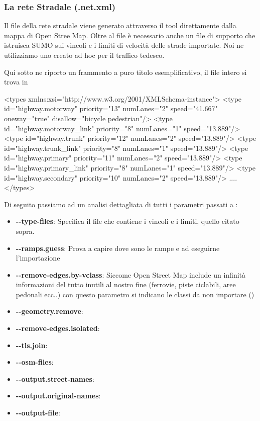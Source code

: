 \subsubsection{La rete Stradale (.net.xml)}

Il file della rete stradale viene generato attraverso il tool  direttamente dalla mappa di Open Stree Map. Oltre al file  è necessario anche un file di supporto che istruisca SUMO sui vincoli e i limiti di velocità delle strade importate. Noi ne utilizziamo uno creato ad hoc per il traffico tedesco. 

Qui sotto ne riporto un frammento a puro titolo esemplificativo, il file intero si trova in 

\begin{xml}
<types xmlns:xsi="http://www.w3.org/2001/XMLSchema-instance">
  <type id="highway.motorway" priority="13" numLanes="2" speed="41.667"
                oneway="true" disallow="bicycle pedestrian"/>
  <type id="highway.motorway_link" priority="8" numLanes="1" speed="13.889"/>
  <type id="highway.trunk" priority="12" numLanes="2" speed="13.889"/>
  <type id="highway.trunk_link" priority="8" numLanes="1" speed="13.889"/>
  <type id="highway.primary" priority="11" numLanes="2" speed="13.889"/>
  <type id="highway.primary_link" priority="8" numLanes="1" speed="13.889"/>
  <type id="highway.secondary" priority="10" numLanes="2" speed="13.889"/>
  ....
</types> 
\end{xml}

Di seguito passiamo ad un analisi dettagliata di tutti i parametri passati a :

\begin{itemize}
	\item \textbf{-{}-type-files}: Specifica il file che contiene i vincoli e i limiti, quello citato sopra.
	\item \textbf{-{}-ramps.guess}: Prova a capire dove sono le rampe e ad eseguirne l'importazione
	\item \textbf{-{}-remove-edges.by-vclass}: Siccome Open Street Map include un infinità informazioni del tutto inutili al nostro fine (ferrovie, piste ciclabili, aree pedonali ecc..) con questo parametro si indicano le classi da non importare ()
	\item \textbf{-{}-geometry.remove}:
	\item \textbf{-{}-remove-edges.isolated}:
	\item \textbf{-{}-tls.join}:
	\item \textbf{-{}-osm-files}:
	\item \textbf{-{}-output.street-names}:
	\item \textbf{-{}-output.original-names}:
	\item \textbf{-{}-output-file}:
\end{itemize}

